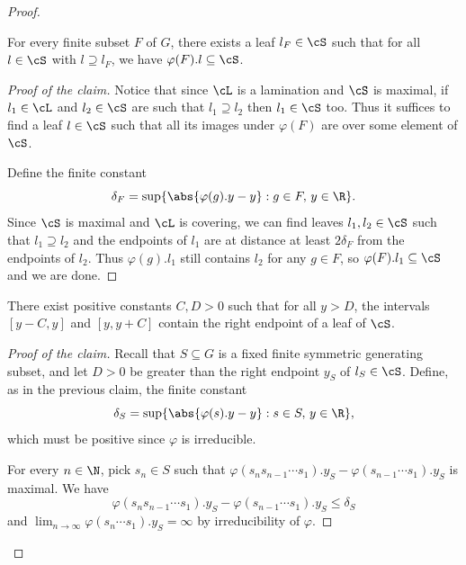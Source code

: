 \documentclass[reqno]{amsart}
\begin{document}
\begin{proof}
\begin{itemize}
\setcounter{claimnum}{0}
\begin{claimnum} \label{claim:stable}
        For every finite subset $F$ of $G$, there exists a leaf $l_F \in \cS$ such that for all $l \in \cS$ with $l \supseteq l_F$, we have $\varphi(F).l \subseteq \cS$.%
\end{claimnum}

\begin{proof}[Proof of the claim]
Notice that since $\cL$ is a lamination and $\cS$ is maximal, if $l_1 \in \cL$ and $l_2 \in \cS$ are such that $l_1 \supseteq l_2$ then $l_1 \in \cS$ too. Thus it suffices to find a leaf $l \in \cS$ such that all its images under $\varphi(F)$ are over some element of $\cS$.

Define the finite constant
\[
        \delta_F = \sup\{\abs{\varphi(g).y- y} : g \in F, \, y \in \R\}.
\]
Since $\cS$ is maximal and $\cL$ is covering, we can find leaves $l_1, l_2 \in \cS$ such that $l_1 \supseteq l_2$ and the endpoints of $l_1$ are at distance at least $2 \delta_F$ from the endpoints of $l_2$. Thus $\varphi(g).l_1$ still contains $l_2$ for any $g \in F$, so $\varphi(F).l_1 \subseteq \cS$ and we are done.
\end{proof}

\begin{claimnum} \label{claim:endpoints}
        There exist positive constants $C,D > 0$ such that for all $y > D$, the intervals $[y - C,y]$ and $[y, y + C]$ contain the right endpoint of a leaf of $\cS$.
\end{claimnum}

\begin{proof}[Proof of the claim]
Recall that $S \subseteq G$ is a fixed finite symmetric generating subset, and let $D > 0$ be greater than the right endpoint $y_S$ of $l_S \in \cS$. Define, as in the previous claim, the finite constant
\[
        \delta_S = \sup\{\abs{\varphi(s).y - y} : s \in S, \,  y \in \R\},
\]
which must be positive since $\varphi$ is irreducible. 

For every $n \in \N$, pick $s_n \in S$ such that $\varphi(s_n s_{n-1}\cdots s_1).y_S - \varphi(s_{n-1}\cdots s_1).y_S$ is maximal. We have
\[
        \varphi(s_n s_{n-1}\cdots s_1).y_S - \varphi(s_{n-1}\cdots s_1).y_S \leq \delta_S
\]
and $\lim_{n \to \infty} \varphi(s_n \cdots s_1).y_S = \infty$ by irreducibility of $\varphi$.


\end{proof}
\end{itemize}
\end{proof}
\end{document}
